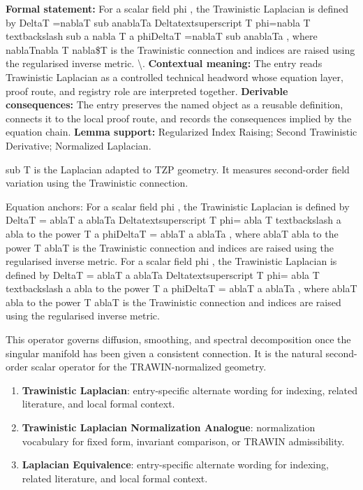 \begingroup\footnotesize\setlength{\emergencystretch}{3em}\sloppy
\textbf{Formal statement:} For a scalar field  phi , the Trawinistic Laplacian is defined by DeltaT =nablaT sub anablaTa Deltatextsuperscript T phi=nabla T textbackslash sub a nabla T a phiDeltaT =nablaT sub anablaTa , where nablaTnabla T nabla\$T is the Trawinistic connection and indices are raised using the regularised inverse metric. \textbackslash{}. \textbf{Contextual meaning:} The entry reads Trawinistic Laplacian as a controlled technical headword whose equation layer, proof route, and registry role are interpreted together. \textbf{Derivable consequences:} The entry preserves the named object as a reusable definition, connects it to the local proof route, and records the consequences implied by the equation chain. \textbf{Lemma support:} Regularized Index Raising; Second Trawinistic Derivative; Normalized Laplacian.\par
\endgroup

sub T is the Laplacian adapted to TZP geometry. It measures second-order field variation using the Trawinistic connection.

Equation anchors: For a scalar field  phi , the Trawinistic Laplacian is defined by DeltaT = ablaT a ablaTa Deltatextsuperscript T phi= abla T textbackslash a abla to the power T a phiDeltaT = ablaT a ablaTa , where ablaT abla to the power T ablaT is the Trawinistic connection and indices are raised using the regularised inverse metric. For a scalar field  phi , the Trawinistic Laplacian is defined by DeltaT = ablaT a ablaTa Deltatextsuperscript T phi= abla T textbackslash a abla to the power T a phiDeltaT = ablaT a ablaTa , where ablaT abla to the power T ablaT is the Trawinistic connection and indices are raised using the regularised inverse metric.

This operator governs diffusion, smoothing, and spectral decomposition once the singular manifold has been given a consistent connection. It is the natural second-order scalar operator for the TRAWIN-normalized geometry.
\endgroup

\begingroup\footnotesize\sloppy
\begin{enumerate}[leftmargin=1.35em,itemsep=1pt,topsep=1pt,parsep=0pt]
\item \textbf{Trawinistic Laplacian}: entry-specific alternate wording for indexing, related literature, and local formal context.
\item \textbf{Trawinistic Laplacian Normalization Analogue}: normalization vocabulary for fixed form, invariant comparison, or TRAWIN admissibility.
\item \textbf{Laplacian Equivalence}: entry-specific alternate wording for indexing, related literature, and local formal context.
\end{enumerate}
\endgroup


